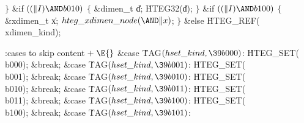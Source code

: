 ${}\}{}$\2\6
\&{if} ${}((\|I)\AND\\{b010}){}$\5
\1${}\{{}$\5
\&{dimen\_t} \|d;\5
\.{HTEG32}(\|d);\5
${}\}{}$\2\6
\&{if} ${}((\|I)\AND\\{b100}){}$\5
\1${}\{{}$\5
\&{xdimen\_t} \|x;\7
${}\index{hteg xdimen node+\\{hteg\_xdimen\_node}}\\{hteg\_xdimen\_node}({\AND}\|x){}$;\5
${}\}{}$\5
\2\&{else}\1\5
\.{HTEG\_REF}(\\{xdimen\_kind});\2
\Y
\fi


\Y\B\4:cases to skip content\X${}\mathrel+\E{}$\6
\4\&{case} \.{TAG}${}(\index{hset kind+\\{hset\_kind}}\\{hset\_kind},\39\\{b000}){}$:\5
\.{HTEG\_SET}(\\{b000});\5
\&{break};\6
\4\&{case} \.{TAG}${}(\index{hset kind+\\{hset\_kind}}\\{hset\_kind},\39\\{b001}){}$:\5
\.{HTEG\_SET}(\\{b001});\5
\&{break};\6
\4\&{case} \.{TAG}${}(\index{hset kind+\\{hset\_kind}}\\{hset\_kind},\39\\{b010}){}$:\5
\.{HTEG\_SET}(\\{b010});\5
\&{break};\6
\4\&{case} \.{TAG}${}(\index{hset kind+\\{hset\_kind}}\\{hset\_kind},\39\\{b011}){}$:\5
\.{HTEG\_SET}(\\{b011});\5
\&{break};\6
\4\&{case} \.{TAG}${}(\index{hset kind+\\{hset\_kind}}\\{hset\_kind},\39\\{b100}){}$:\5
\.{HTEG\_SET}(\\{b100});\5
\&{break};\6
\4\&{case} \.{TAG}${}(\index{hset kind+\\{hset\_kind}}\\{hset\_kind},\39\\{b101}){}$:\5
